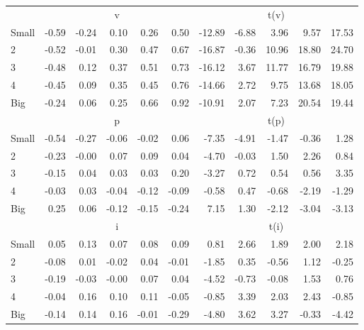 \begin{table}[!ht]
\begin{tabular}{lrrrrrrrrrr}
  
     & \multicolumn{5}{c}{v} & \multicolumn{5}{c}{t(v)}   \\
     \cmidrule(r){2-6} \cmidrule(r){7-11} 
    Small  & -0.59  & -0.24  & 0.10  & 0.26  & 0.50  & -12.89  & -6.88  & 3.96  & 9.57  & 17.53   \\
    2  & -0.52  & -0.01  & 0.30  & 0.47  & 0.67  & -16.87  & -0.36  & 10.96  & 18.80  & 24.70   \\
    3  & -0.48  & 0.12  & 0.37  & 0.51  & 0.73  & -16.12  & 3.67  & 11.77  & 16.79  & 19.88   \\
    4  & -0.45  & 0.09  & 0.35  & 0.45  & 0.76  & -14.66  & 2.72  & 9.75  & 13.68  & 18.05   \\
    Big  & -0.24  & 0.06  & 0.25  & 0.66  & 0.92  & -10.91  & 2.07  & 7.23  & 20.54  & 19.44   \\
    
  
     & \multicolumn{5}{c}{p} & \multicolumn{5}{c}{t(p)}   \\
     \cmidrule(r){2-6} \cmidrule(r){7-11} 
    Small  & -0.54  & -0.27  & -0.06  & -0.02  & 0.06  & -7.35  & -4.91  & -1.47  & -0.36  & 1.28   \\
    2  & -0.23  & -0.00  & 0.07  & 0.09  & 0.04  & -4.70  & -0.03  & 1.50  & 2.26  & 0.84   \\
    3  & -0.15  & 0.04  & 0.03  & 0.03  & 0.20  & -3.27  & 0.72  & 0.54  & 0.56  & 3.35   \\
    4  & -0.03  & 0.03  & -0.04  & -0.12  & -0.09  & -0.58  & 0.47  & -0.68  & -2.19  & -1.29   \\
    Big  & 0.25  & 0.06  & -0.12  & -0.15  & -0.24  & 7.15  & 1.30  & -2.12  & -3.04  & -3.13   \\
    
  
     & \multicolumn{5}{c}{i} & \multicolumn{5}{c}{t(i)}   \\
     \cmidrule(r){2-6} \cmidrule(r){7-11} 
    Small  & 0.05  & 0.13  & 0.07  & 0.08  & 0.09  & 0.81  & 2.66  & 1.89  & 2.00  & 2.18   \\
    2  & -0.08  & 0.01  & -0.02  & 0.04  & -0.01  & -1.85  & 0.35  & -0.56  & 1.12  & -0.25   \\
    3  & -0.19  & -0.03  & -0.00  & 0.07  & 0.04  & -4.52  & -0.73  & -0.08  & 1.53  & 0.76   \\
    4  & -0.04  & 0.16  & 0.10  & 0.11  & -0.05  & -0.85  & 3.39  & 2.03  & 2.43  & -0.85   \\
    Big  & -0.14  & 0.14  & 0.16  & -0.01  & -0.29  & -4.80  & 3.62  & 3.27  & -0.33  & -4.42   \\
    
  
  \bottomrule
\end{tabular}
\label{tbl:25_Size_BM_F16}
\end{table}